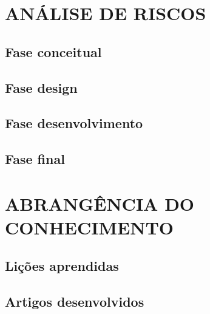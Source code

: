 \chapter{ANÁLISE DE RISCOS}
\label{chap:rsk}

\section{Fase conceitual}
\label{sec:rskconc}

\section{Fase design}
\label{sec:rskdesig}

\section{Fase desenvolvimento}
\label{sec:rskdesen}

\section{Fase final}
\label{sec:rskconcl}

\chapter{ABRANGÊNCIA DO CONHECIMENTO}
\label{chap:abrconhec}

\section{Lições aprendidas}
\label{sec:lic}

\section{Artigos desenvolvidos}
\label{sec:art}

